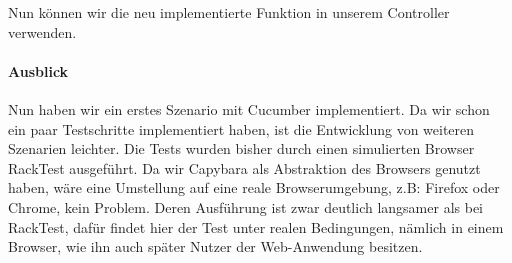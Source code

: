 Nun können wir die neu implementierte Funktion in unserem Controller verwenden.

\paragraph{Ausblick}
Nun haben wir ein erstes Szenario mit Cucumber implementiert. Da wir schon ein paar Testschritte implementiert haben, ist die Entwicklung von weiteren Szenarien leichter. 
Die Tests wurden bisher durch einen simulierten Browser RackTest ausgeführt. Da wir Capybara als Abstraktion des Browsers genutzt haben, wäre eine Umstellung auf eine reale Browserumgebung, z.B: Firefox oder Chrome, kein Problem. Deren Ausführung ist zwar deutlich langsamer als bei RackTest, dafür findet hier der Test unter realen Bedingungen, nämlich in einem Browser, wie ihn auch später Nutzer der Web-Anwendung besitzen.
